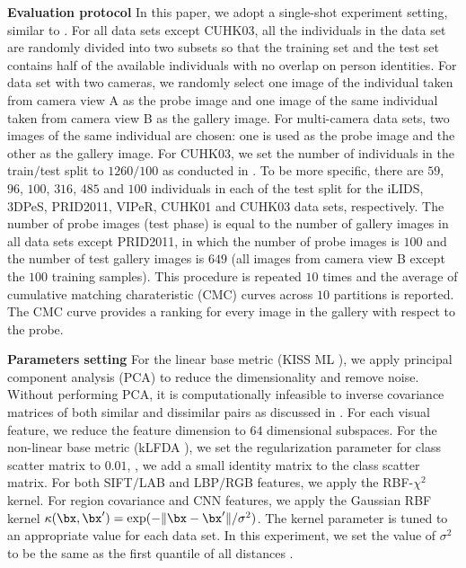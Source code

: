 \documentclass[10pt,twocolumn,letterpaper]{article}
\renewcommand{\paragraph}{\textbf}
\begin{document}
\paragraph{Evaluation protocol}
%
In this paper, we adopt a single-shot experiment
setting, similar to \cite{Li2013Learning,
Pedagadi2013Local, Xiong2014Person, Zhao2014Learning, Zheng2011Person}.
For all data sets except CUHK03, all the individuals in the data set are
randomly divided into two subsets so that
the training set and the test
set contains half of the available individuals with no overlap on person identities.
For data set with two cameras, we randomly select one image of the individual
taken from camera view A as the probe image
and one image of the same individual taken from camera view B
as the gallery image.
For multi-camera data sets, two images of the same individual
are chosen: one is used as the probe image and the other as the gallery image.
For CUHK03, we set the number of individuals in the train$/$test split
to $1260$$/$$100$ as conducted in \cite{Li2014Deep}.
To be more specific, there are $59$, $96$, $100$, $316$, $485$ and $100$ individuals
in each of the test split for the iLIDS, 3DPeS, PRID2011, VIPeR, CUHK01 and CUHK03
data sets, respectively.
The number of probe images (test phase) is equal to the number of
gallery images in all data sets except
PRID2011, in which the number of probe images is $100$
and the number of test gallery images is $649$
(all images from camera view B except the $100$ training samples).
This procedure is repeated $10$ times and the
average of cumulative matching charateristic (CMC) curves across
$10$ partitions is reported.
The CMC curve provides a ranking for every image in the gallery
with respect to the probe.



\paragraph{Parameters setting}
%
%
For the linear base metric (KISS ML \cite{Kostinger2012Large}),
we apply principal component analysis (PCA) to
reduce the dimensionality and remove noise.
Without performing PCA, it is computationally infeasible to
inverse covariance matrices of both similar and dissimilar
pairs as discussed in \cite{Kostinger2012Large}.
For each visual feature, we
reduce the feature dimension to $64$ dimensional subspaces.
For the non-linear base metric (kLFDA \cite{Xiong2014Person}),
we set the regularization parameter
for class scatter matrix to $0.01$,
\ie, we add a small identity matrix to the class scatter matrix.
For both SIFT$/$LAB and LBP$/$RGB features, we apply the RBF-$\chi^2$ kernel.
For region covariance and CNN features, we apply
the Gaussian RBF kernel $\kappa(\bx,\bx^\prime) = \exp(-\| \bx - \bx^\prime \| / \sigma^2)$.
The kernel parameter is tuned to an appropriate value for each
data set.
In this experiment, we set the value of $\sigma^2$ to be the
same as the first quantile of all distances \cite{Xiong2014Person}.
\end{document}
